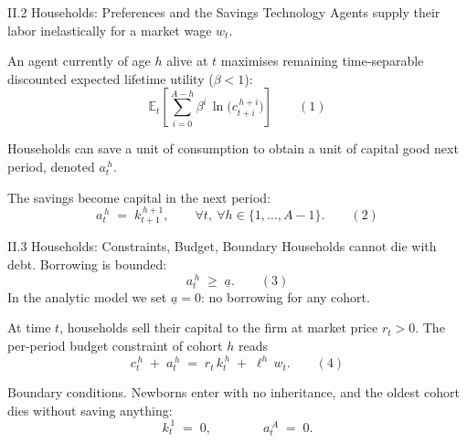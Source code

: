 \documentclass[aspectratio=169,11pt]{beamer}
\newcommand{\emphc}[1]{\textcolor{harvardcrimson}{#1}}
\begin{document}
\begin{frame}{II.2 Households: Preferences and the Savings Technology}
\small
Agents supply their labor \emphc{inelastically} for a market wage $w_t$.

\vspace{0.6em}
An agent \emphc{currently of age $h$} alive at $t$ maximises remaining time-separable discounted expected lifetime utility ($\beta < 1$):
\[
\mathbb{E}_t\!\left[\sum_{i=0}^{A-h} \beta^i \,\ln\!\bigl(c_{t+i}^{\,h+i}\bigr)\right] \qquad (1)
\]

\vspace{0.3em}
Households can save a unit of consumption to obtain a unit of capital good next period, denoted $a_t^{\,h}$.

\vspace{0.4em}
The savings become \emphc{capital in the next period}:
\[
a_t^{\,h} \;=\; k_{t+1}^{\,h+1}, \qquad \forall t,\ \forall h \in \{1, \ldots, A-1\}. \qquad (2)
\]
\end{frame}


\begin{frame}{II.3 Households: Constraints, Budget, Boundary}
\small
Households \emphc{cannot die with debt}.  Borrowing is bounded:
\[
a_t^{\,h} \;\ge\; \underline{a}. \qquad (3)
\]
In the analytic model we set $\underline{a} = 0$: \emphc{no borrowing} for any cohort.

\vspace{0.4em}
At time $t$, households sell their capital to the firm at market price $r_t > 0$.  The per-period \emphc{budget constraint} of cohort $h$ reads
\[
c_t^{\,h} \;+\; a_t^{\,h} \;=\; r_t\, k_t^{\,h} \;+\; \ell^h\, w_t. \qquad (4)
\]

\vspace{0.4em}
\emphc{Boundary conditions.}  Newborns enter with no inheritance, and the oldest cohort dies without saving anything:
\[
k_t^{\,1} \;=\; 0, \qquad\qquad a_t^{\,A} \;=\; 0.
\]
\end{frame}
\end{document}
